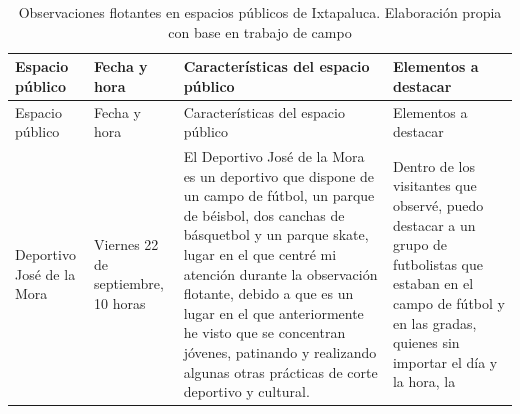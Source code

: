 \documentclass[
  spanish,
  11pt,
  a4paper,
]{scrbook}
\begin{document}
\begin{longtable}[]{@{}
  >{\raggedright\arraybackslash}p{}
  >{\raggedright\arraybackslash}p{}
  >{\raggedright\arraybackslash}p{}
  >{\raggedright\arraybackslash}p{}@{}}
\caption{Observaciones flotantes en espacios públicos de Ixtapaluca.
Elaboración propia con base en trabajo de
campo}\label{tbl-1}\tabularnewline
\toprule\noalign{}
\begin{minipage}[b]{\linewidth}\raggedright
Espacio público
\end{minipage} & \begin{minipage}[b]{\linewidth}\raggedright
Fecha y hora
\end{minipage} & \begin{minipage}[b]{\linewidth}\raggedright
Características del espacio público
\end{minipage} & \begin{minipage}[b]{\linewidth}\raggedright
Elementos a destacar
\end{minipage} \\
\midrule\noalign{}
\endfirsthead
\toprule\noalign{}
\begin{minipage}[b]{\linewidth}\raggedright
Espacio público
\end{minipage} & \begin{minipage}[b]{\linewidth}\raggedright
Fecha y hora
\end{minipage} & \begin{minipage}[b]{\linewidth}\raggedright
Características del espacio público
\end{minipage} & \begin{minipage}[b]{\linewidth}\raggedright
Elementos a destacar
\end{minipage} \\
\midrule\noalign{}
\endhead
\bottomrule\noalign{}
\endlastfoot
Deportivo José de la Mora & Viernes 22 de septiembre, 10 horas & El
Deportivo José de la Mora es un deportivo que dispone de un campo de
fútbol, un parque de béisbol, dos canchas de básquetbol y un parque
skate, lugar en el que centré mi atención durante la observación
flotante, debido a que es un lugar en el que anteriormente he visto que
se concentran jóvenes, patinando y realizando algunas otras prácticas de
corte deportivo y cultural. & Dentro de los visitantes que observé,
puedo destacar a un grupo de futbolistas que estaban en el campo de
fútbol y en las gradas, quienes sin importar el día y la hora, la

\end{longtable}
\end{document}
